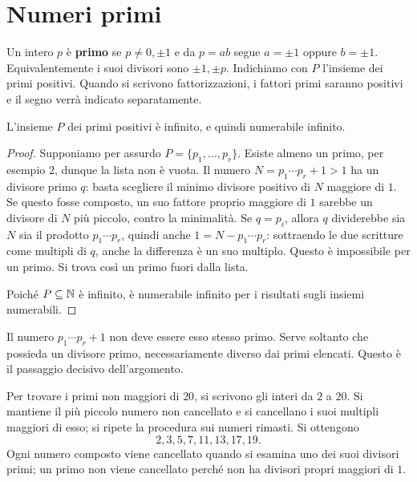 \section{Numeri primi}
\begin{definizione}
Un intero $p$ è \textbf{primo} se $p\ne0,\pm1$ e da $p=ab$ segue $a=\pm1$ oppure $b=\pm1$. Equivalentemente i suoi divisori sono $\pm1,\pm p$. Indichiamo con $P$ l'insieme dei primi positivi. Quando si scrivono fattorizzazioni, i fattori primi saranno positivi e il segno verrà indicato separatamente.
\end{definizione}

\begin{teorema}
L'insieme $P$ dei primi positivi è infinito, e quindi numerabile infinito.
\end{teorema}
\begin{proof}
Supponiamo per assurdo $P=\{p_1,\ldots,p_r\}$. Esiste almeno un primo, per esempio $2$, dunque la lista non è vuota. Il numero $N=p_1\cdots p_r+1>1$ ha un divisore primo $q$: basta scegliere il minimo divisore positivo di $N$ maggiore di $1$. Se questo fosse composto, un suo fattore proprio maggiore di $1$ sarebbe un divisore di $N$ più piccolo, contro la minimalità. Se $q=p_i$, allora $q$ dividerebbe sia $N$ sia il prodotto $p_1\cdots p_r$, quindi anche $1=N-p_1\cdots p_r$: sottraendo le due scritture come multipli di $q$, anche la differenza è un suo multiplo. Questo è impossibile per un primo. Si trova così un primo fuori dalla lista.

Poiché $P\subseteq\mathbb{N}$ è infinito, è numerabile infinito per i risultati sugli insiemi numerabili.
\end{proof}

\begin{osservazione}
Il numero $p_1\cdots p_r+1$ non deve essere esso stesso primo. Serve soltanto che possieda un divisore primo, necessariamente diverso dai primi elencati. Questo è il passaggio decisivo dell'argomento.
\end{osservazione}

\begin{esempio}
Per trovare i primi non maggiori di $20$, si scrivono gli interi da $2$ a $20$. Si mantiene il più piccolo numero non cancellato e si cancellano i suoi multipli maggiori di esso; si ripete la procedura sui numeri rimasti. Si ottengono
\[
2,3,5,7,11,13,17,19.
\]
Ogni numero composto viene cancellato quando si esamina uno dei suoi divisori primi; un primo non viene cancellato perché non ha divisori propri maggiori di $1$.
\end{esempio}

